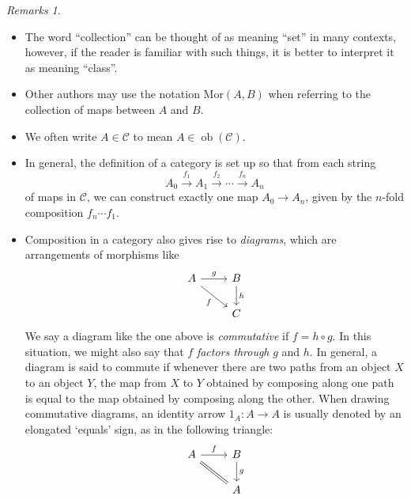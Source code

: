 \documentclass[10pt,oneside]{book}
\def\~#1{\mathscr{#1}}
\def\To#1{\xrightarrow{#1}}
\newcommand{\ob}{\mathop{\mathrm{ob}}}
\theoremstyle{plain}
\theoremstyle{definition}
\theoremstyle{remark}
\newtheorem*{rmks}{Remarks}
\numberwithin{equation}{section}
\numberwithin{figure}{section}
\begin{document}
\begin{rmks}
    \hfill
    \begin{itemize}
    
    \item The word ``collection'' can be thought of as meaning ``set'' in many contexts, however, if the reader is familiar with such things, it is better to interpret it as meaning ``class''.
        
    \item Other authors may use the notation $\text{Mor}(A, B)$ when referring to the collection of maps between $A$ and $B$. 
    
    
    \item We often write $A \in \~{C}$ to mean $A \in \ob(\~C)$.
    
    \item  In general, the definition of a category is set up so that from each string 
        \[A_0 \To{f_1} A_1 \To{f_2} \cdots \To{f_n} A_n\]
        of maps in $\~{C}$, we can construct exactly one map $A_0 \to A_n$, given by the $n$-fold composition $f_n \cdots f_1$.
    
    \item Composition in a category also gives rise to \emph{diagrams}, which are arrangements of morphisms like
    \[\begin{tikzcd}
        A & B \\
        & C
        \arrow["g", from=1-1, to=1-2]
        \arrow["f"', from=1-1, to=2-2]
        \arrow["h", from=1-2, to=2-2]
    \end{tikzcd}\]
    We say a diagram like the one above is \emph{commutative} if $f = h \circ g$. In this situation, we might also say that $f$ \emph{factors through} $g$ and $h$. In general, a diagram is said to commute if whenever there are two paths from an object $X$ to an object $Y$, the map from $X$ to $Y$ obtained by composing along one path is equal to the map obtained by composing along the other. When drawing commutative diagrams, an identity arrow $1_A: A \to A$ is usually denoted by an elongated `equals' sign, as in the following triangle:
    \[\begin{tikzcd}
        A & B \\
        & A
        \arrow["f", from=1-1, to=1-2]
        \arrow[Rightarrow, no head, from=1-1, to=2-2]
        \arrow["g", from=1-2, to=2-2]
    \end{tikzcd}\]
    \end{itemize}
\end{rmks}
\end{document}
